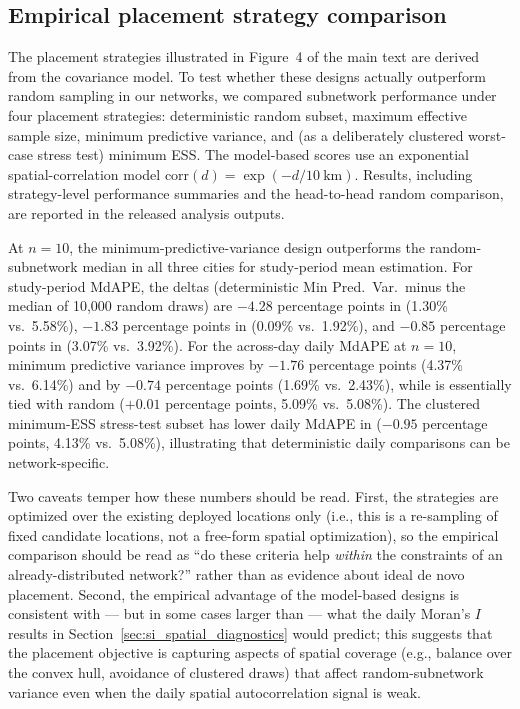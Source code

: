 \subsection{Empirical placement strategy comparison}\label{sec:si_placement_empirical}

The placement strategies illustrated in Figure~4 of the main text are derived from the covariance model. To test whether these designs actually outperform random sampling in our networks, we compared subnetwork performance under four placement strategies: deterministic random subset, maximum effective sample size, minimum predictive variance, and (as a deliberately clustered worst-case stress test) minimum ESS. The model-based scores use an exponential spatial-correlation model $\mathrm{corr}(d) = \exp(-d / 10~\mathrm{km})$. Results, including strategy-level performance summaries and the head-to-head random comparison, are reported in the released analysis outputs.

At $n=10$, the minimum-predictive-variance design outperforms the random-subnetwork median in all three cities for study-period mean estimation. For study-period MdAPE, the deltas (deterministic Min Pred.\ Var.\ minus the median of 10{,}000 random draws) are $-4.28$ percentage points in  (1.30\% vs.\ 5.58\%), $-1.83$ percentage points in  (0.09\% vs.\ 1.92\%), and $-0.85$ percentage points in  (3.07\% vs.\ 3.92\%). For the across-day daily MdAPE at $n=10$, minimum predictive variance improves  by $-1.76$ percentage points (4.37\% vs.\ 6.14\%) and  by $-0.74$ percentage points (1.69\% vs.\ 2.43\%), while  is essentially tied with random ($+0.01$ percentage points, 5.09\% vs.\ 5.08\%). The clustered minimum-ESS stress-test subset has lower daily MdAPE in  ($-0.95$ percentage points, 4.13\% vs.\ 5.08\%), illustrating that deterministic daily comparisons can be network-specific.

Two caveats temper how these numbers should be read. First, the strategies are optimized over the existing deployed locations only (i.e., this is a re-sampling of fixed candidate locations, not a free-form spatial optimization), so the empirical comparison should be read as ``do these criteria help \emph{within} the constraints of an already-distributed network?'' rather than as evidence about ideal de novo placement. Second, the empirical advantage of the model-based designs is consistent with --- but in some cases larger than --- what the daily Moran's $I$ results in Section~\ref{sec:si_spatial_diagnostics} would predict; this suggests that the placement objective is capturing aspects of spatial coverage (e.g., balance over the convex hull, avoidance of clustered draws) that affect random-subnetwork variance even when the daily spatial autocorrelation signal is weak.

